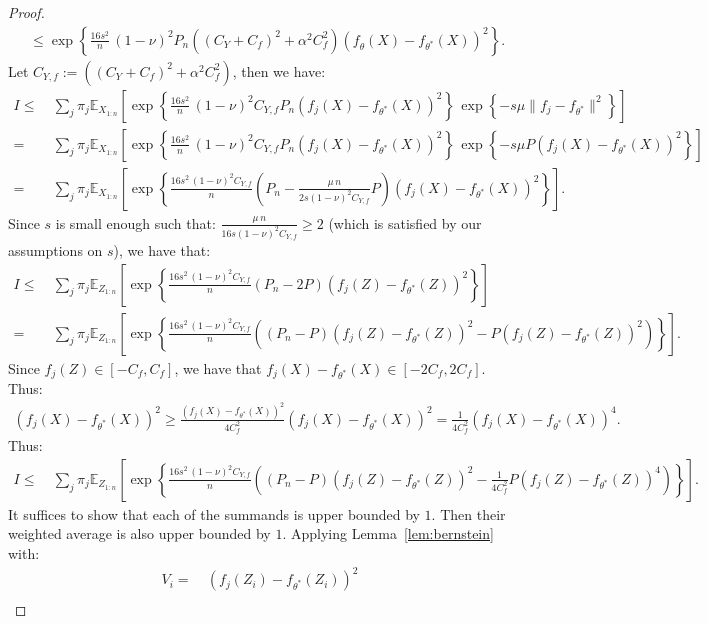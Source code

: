 \documentclass[12pt]{extarticle} %
\newcommand{\E}{\mathbb{E}}
\begin{document}
\begin{proof}
\begin{align*}
    ~&\leq \exp\left\{\frac{16 s^2}{n}\,(1-\nu)^2 P_n((C_Y+C_f)^2+\alpha^2 C_f^2)(f_{\hat{\theta}}(X)-f_{\theta^*}(X))^2 \right\}.
\end{align*}
Let $C_{Y,f}:=((C_Y+C_f)^2+\alpha^2 C_f^2)$, then we have:
\begin{align*}
    I\leq~&\sum_{j} {\pi_j}\E_{X_{1:n}}\left[ \exp\left\{\frac{16s^2}{n}\,(1-\nu)^2C_{Y,f} P_n(f_{j}(X) - f_{\theta^*}(X))^2\right\}\, \exp\left\{- s \mu \|f_j - f_{\theta^*}\|^2\right\}\right]\\
    =~& \sum_{j} {\pi_j}\E_{X_{1:n}}\left[ \exp\left\{\frac{16s^2}{n}\,(1-\nu)^2 C_{Y,f}  P_n(f_{j}(X) - f_{\theta^*}(X))^2\right\}\, \exp\left\{- s \mu P (f_j(X) - f_{\theta^*}(X))^2\right\}\right]\\
    =~& \sum_{j} {\pi_j} \E_{X_{1:n}}\left[ \exp\left\{\frac{16s^2\,(1-\nu)^2C_{Y,f} }{n} \left(P_n - \frac{\mu\, n}{2 s(1-\nu)^2 C_{Y,f} }P\right)(f_{j}(X) - f_{\theta^*}(X))^2\right\}\right].
\end{align*}
Since $s$ is small enough such that: $\frac{\mu\, n}{16 s (1-\nu)^2 C_{Y,f}}\geq 2$ (which is satisfied by our assumptions on $s$), we have that:
\begin{align*}
    I \leq~& \sum_{j} \pi_j \E_{Z_{1:n}}\left[ \exp\left\{\frac{16s^2\,(1-\nu)^2 C_{Y,f}}{n} \left(P_n - 2P\right)(f_{j}(Z) - f_{\theta^*}(Z))^2\right\}\right]\\
    =~& \sum_{j} \pi_j\E_{Z_{1:n}}\left[ \exp\left\{\frac{16s^2\,(1-\nu)^2 C_{Y,f}}{n} \left(\left(P_n - P\right)(f_{j}(Z) - f_{\theta^*}(Z))^2 - P (f_{j}(Z) - f_{\theta^*}(Z))^2 \right)\right\}\right].
\end{align*}
Since $f_j(Z)\in [-C_f, C_f]$, we have that $f_j(X) - f_{\theta^*}(X)\in [-2C_f, 2C_f]$. Thus:
\begin{align*}
(f_j(X)-f_{\theta^*}(X))^2\geq \frac{(f_j(X)-f_{\theta^*}(X))^2}{4C_f^2} (f_j(X)-f_{\theta^*}(X))^2 = \frac{1}{4C_f^2} (f_j(X)-f_{\theta^*}(X))^4.
\end{align*}
Thus:
\begin{align*}
    I \leq~& \sum_{j} \pi_j \E_{Z_{1:n}}\left[ \exp\left\{\frac{16s^2\,(1-\nu)^2 C_{Y,f}}{n} \left(\left(P_n - P\right)(f_{j}(Z) - f_{\theta^*}(Z))^2 - \frac{1}{4C_f^2} P (f_{j}(Z) - f_{\theta^*}(Z))^4 \right)\right\}\right].
\end{align*}
It suffices to show that each of the summands is upper bounded by $1$. Then their weighted average is also upper bounded by $1$.
Applying Lemma~\ref{lem:bernstein} with:
\begin{align*}
    V_i =~& (f_j(Z_i) - f_{\theta^*}(Z_i))^2\nonumber\\

\end{align*}
\end{proof}
\end{document}
